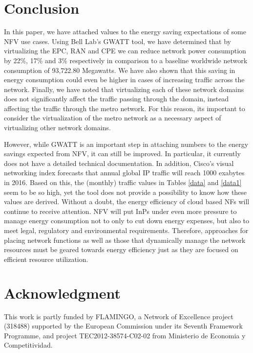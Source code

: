 \documentclass[conference]{IEEEtran}
\begin{document}
\section{Conclusion}\label{concl}

In this paper, we have attached values to the energy saving expectations of some NFV use cases. Using Bell Lab's GWATT tool, we have determined that by virtualizing the EPC, RAN and CPE we can reduce network power consumption by 22\%, 17\% and 3\% respectively in comparison to a baseline worldwide network consumption of 93,722.80 Megawatts. We have also shown that this saving in energy consumption could even be higher in cases of increasing traffic across the network. Finally, we have noted that virtualizing each of these network domains does not significantly affect the traffic passing through the domain, instead affecting the traffic through the metro network. For this reason, its important to consider the virtualization of the metro network as a necessary aspect of virtualizing other network domains.

However, while GWATT is an important step in attaching numbers to the energy savings expected from NFV, it can still be improved. In particular, it currently does not have a detailed technical documentation. In addition, Cisco's visual
networking index \cite{Cisco15} forecasts that annual global IP traffic will reach 1000 exabytes in 2016. Based on this, the (monthly) traffic values in Tables \ref{data} and \ref{data1} seem to be so high, yet the tool does not provide a possibility to know how these values are derived. Without a doubt, the energy efficiency of cloud based NFs will continue to receive attention. NFV will put InPs under even more pressure to manage energy consumption not to only to cut down energy expenses, but also to meet legal, regulatory and environmental requirements. Therefore, approaches for placing network functions \cite{path, aims} as well as those that dynamically manage the network resources \cite{rl, neurofuzzy, sdn, neural} must be geared towards energy efficiency just as they are focused on efficient resource utilization.



\section*{Acknowledgment}
This work is partly funded by FLAMINGO, a Network of Excellence project (318488) supported by the European Commission under its Seventh Framework Programme, and project TEC2012-38574-C02-02 from Ministerio de Economia y Competitividad.




\end{document}
